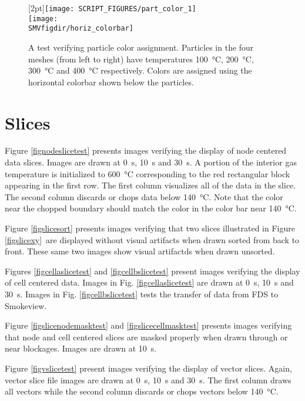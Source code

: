 \documentclass[11pt,twoside]{book}
\begin{document}
\begin{figure}[bph]
\begin{center}
\raisebox{2.0ex}[2pt]{\texttt{[image: SCRIPT\_FIGURES/part\_color\_1]}}\\
\texttt{[image: \\SMVfigdir/horiz\_colorbar]}
\end{center}
 \caption[A test verifying particle color assignment]
 {A test verifying particle color assignment.
 Particles in the four meshes (from left to right) have temperatures
 \SI{100}{\degreeCelsius},
 \SI{200}{\degreeCelsius},
 \SI{300}{\degreeCelsius} and
 \SI{400}{\degreeCelsius} respectively.  Colors are assigned using the horizontal colorbar shown below the particles.
 }
\label{figparttestcolor}%
\end{figure}

\clearpage

\section{Slices}
Figure \ref{fignodeslicetest} presents images verifying the display of node centered data slices.
Images are drawn at \SI{0}{s}, \SI{10}{s} and \SI{30}{s}. A portion of the interior
gas temperature is initialized to \SI{600}{\degreeCelsius} corresponding to the
red rectangular block appearing in the first row. The first column visualizes
all of the data in the slice.  The second column discards or chops data below
\SI{140}{\degreeCelsius}. Note that the color near the chopped boundary should
match the color in the color bar near \SI{140}{\degreeCelsius}.

Figure \ref{figslicesort} presents images verifying that two slices
illustrated in Figure \ref{figslicexy}\
are displayed without visual artifacts when drawn sorted from back to front.
These same two images show visual artifactds when drawn unsorted.

Figures \ref{figcellaslicetest} and \ref{figcellbslicetest} present images
verifying the display of cell centered data. Images in Fig. \ref{figcellaslicetest}
are drawn at \SI{0}{s}, \SI{10}{s} and \SI{30}{s}. Images in
Fig. \ref{figcellbslicetest} tests the transfer of data from FDS to Smokeview.

Figure \ref{figslicenodemasktest} and \ref{figslicecellmasktest} presents images verifying that node and cell centered slices
are masked properly when drawn through or near blockages. Images are drawn at \SI{10}{s}.

Figure \ref{figvslicetest} present images verifying the display of vector slices.
Again, vector slice file images are drawn at \SI{0}{s}, \SI{10}{s} and \SI{30}{s}.
The first column draws all vectors while the second column discards or chops vectors
below \SI{140}{\degreeCelsius}.
\end{document}
